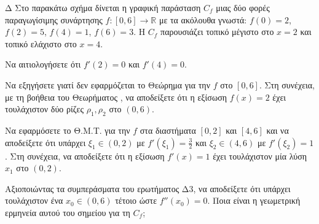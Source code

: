 
\begin{thema}{Δ}
Στο παρακάτω σχήμα δίνεται η γραφική παράσταση $C_f$ μιας δύο φορές παραγωγίσιμης συνάρτησης $f:[0, 6]\to\mathbb{R}$ με τα ακόλουθα γνωστά: $f(0) = 2$, $f(2) = 5$, $f(4) = 1$, $f(6) = 3$. Η $C_f$ παρουσιάζει τοπικό μέγιστο στο $x = 2$ και τοπικό ελάχιστο στο $x = 4$.

\begin{center}
\end{center}

\begin{erwthma}
  \item Να αιτιολογήσετε ότι $f'(2) = 0$ και $f'(4) = 0$.
  \item Να εξηγήσετε γιατί δεν εφαρμόζεται το Θεώρημα  για την $f$ στο $[0, 6]$. Στη συνέχεια, με τη βοήθεια του Θεωρήματος , να αποδείξετε ότι η εξίσωση $f(x) = 2$ έχει τουλάχιστον δύο ρίζες $\rho_1, \rho_2$ στο $(0, 6)$.
  \item Να εφαρμόσετε το Θ.Μ.Τ. για την $f$ στα διαστήματα $[0, 2]$ και $[4, 6]$ και να αποδείξετε ότι υπάρχει $\xi_1 \in (0,2)$ με $f'(\xi_1) = \frac{3}{2}$ και $\xi_2 \in (4,6)$ με $f'(\xi_2) = 1$. Στη συνέχεια, να αποδείξετε ότι η εξίσωση $f'(x) = 1$ έχει τουλάχιστον μία λύση $x_1$ στο $(0, 2)$.
  \item Αξιοποιώντας τα συμπεράσματα του ερωτήματος Δ3, να αποδείξετε ότι υπάρχει τουλάχιστον ένα $x_0 \in (0, 6)$ τέτοιο ώστε $f''(x_0) = 0$. Ποια είναι η γεωμετρική ερμηνεία αυτού του σημείου για τη $C_f$;
\end{erwthma}
\end{thema}

